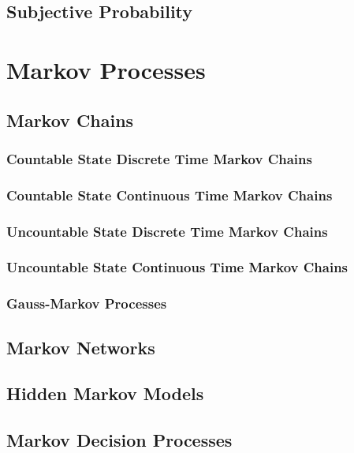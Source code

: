 \documentclass[11pt]{report} %
\begin{document}
\section{Subjective Probability \cite{Schervish1995}}

\chapter{Markov Processes}

\section{Markov Chains}

\subsection{Countable State Discrete Time Markov Chains}

\subsection{Countable State Continuous Time Markov Chains}

\subsection{Uncountable State Discrete Time Markov Chains}

\subsection{Uncountable State Continuous Time Markov Chains}

\subsection{Gauss-Markov Processes}

\section{Markov Networks}

\section{Hidden Markov Models}

\section{Markov Decision Processes}
\end{document}
